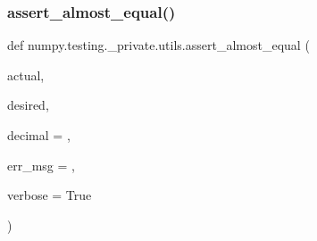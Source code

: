 \subsubsection{\texorpdfstring{assert\+\_\+almost\+\_\+equal()}{assert\_almost\_equal()}}
{\footnotesize\ttfamily def numpy.\+testing.\+\_\+private.\+utils.\+assert\+\_\+almost\+\_\+equal (\begin{DoxyParamCaption}\item[{}]{actual,  }\item[{}]{desired,  }\item[{}]{decimal = {},  }\item[{}]{err\+\_\+msg = {\ttfamily \textquotesingle{}\textquotesingle{}},  }\item[{}]{verbose = {\ttfamily True} }\end{DoxyParamCaption})}


